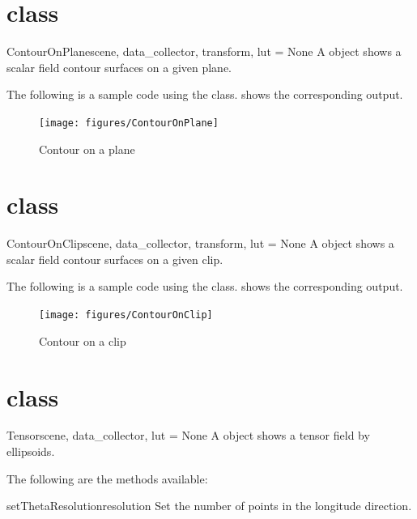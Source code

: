\section{\ContourOnPlane class}
\begin{classdesc}{ContourOnPlane}{scene, data_collector, transform, lut = None}
A \ContourOnPlane object shows a scalar field contour surfaces on a given plane.
\end{classdesc}

The following is a sample code using the \ContourOnPlane class.
 shows the corresponding output.


\begin{figure}[ht]
\begin{center}
\texttt{[image: figures/ContourOnPlane]}
\end{center}
\caption{Contour on a plane}
\label{fig:contouronplane.1}
\end{figure}

\section{\ContourOnClip class}
\begin{classdesc}{ContourOnClip}{scene, data_collector, transform, lut = None}
A \ContourOnClip object shows a scalar field contour surfaces on a given clip.
\end{classdesc}

The following is a sample code using the \ContourOnClip class.
 shows the corresponding output.


\begin{figure}[ht]
\begin{center}
\texttt{[image: figures/ContourOnClip]}
\end{center}
\caption{Contour on a clip}
\label{fig:contouronclip.1}
\end{figure}

\section{\TensorC class}
\begin{classdesc}{Tensor}{scene, data_collector, lut = None}
A \TensorC object shows a tensor field by ellipsoids.
\end{classdesc}

The following are the methods available:
\begin{methoddesc}[Tensor]{setThetaResolution}{resolution}
Set the number of points in the longitude direction.
\end{methoddesc}

